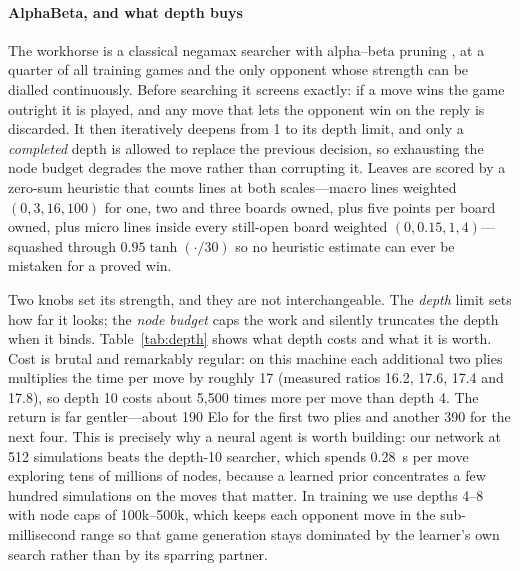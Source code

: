 \documentclass[conference]{IEEEtran}
\begin{document}
\paragraph{AlphaBeta, and what depth buys}
The workhorse is a classical negamax searcher with alpha--beta pruning
\cite{knuth1975alphabeta}, at a quarter of all training games and the only
opponent whose strength can be dialled continuously. Before searching it
screens exactly: if a move wins the game outright it is played, and any move
that lets the opponent win on the reply is discarded. It then iteratively
deepens from 1 to its depth limit, and only a \emph{completed} depth is
allowed to replace the previous decision, so exhausting the node budget
degrades the move rather than corrupting it. Leaves are scored by a
zero-sum heuristic that counts lines at both scales---macro lines weighted
$(0,3,16,100)$ for one, two and three boards owned, plus five points per
board owned, plus micro lines inside every still-open board weighted
$(0,0.15,1,4)$---squashed through $0.95\tanh(\cdot/30)$ so no heuristic
estimate can ever be mistaken for a proved win.

Two knobs set its strength, and they are not interchangeable. The
\emph{depth} limit sets how far it looks; the \emph{node budget} caps the
work and silently truncates the depth when it binds. Table~\ref{tab:depth}
shows what depth costs and what it is worth. Cost is brutal and remarkably
regular: on this machine each additional two plies multiplies the time per
move by roughly 17 (measured ratios 16.2, 17.6, 17.4 and 17.8), so depth 10
costs about 5{,}500 times more per move than depth 4. The return is far
gentler---about 190 Elo for the first two plies and another 390 for the
next four. This is precisely why a neural agent is worth building: our
network at 512 simulations beats the depth-10 searcher, which spends
0.28~s per move exploring tens of millions of nodes, because a learned
prior concentrates a few hundred simulations on the moves that matter.
In training we use depths 4--8 with node caps of 100k--500k, which keeps
each opponent move in the sub-millisecond range so that game generation
stays dominated by the learner's own search rather than by its sparring
partner.
\end{document}
